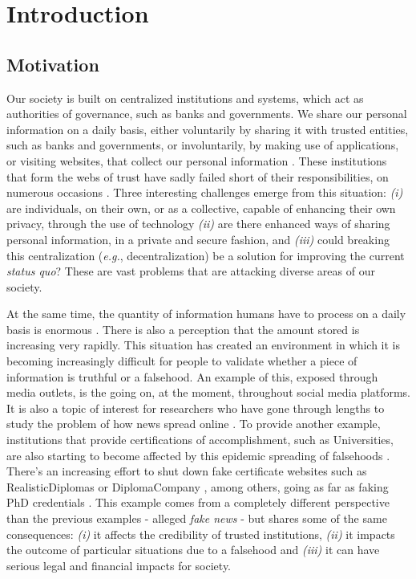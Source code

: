\chapter{Introduction}
\label{chap:intro}

\section{Motivation}
\label{sec:intro-motivation}

Our society is built on centralized institutions and systems, which act as authorities of governance, such as banks and governments. We share our personal information on a daily basis, either voluntarily by sharing it with trusted entities, such as banks and governments, or involuntarily, by making use of applications, or visiting websites, that collect our personal information \cite{debatin_facebook_2009, choi_embarrassing_2015, shilton_four_nodate}. These institutions that form the webs of trust have sadly failed short of their responsibilities, on numerous occasions \cite{gibbs_facebook_2014, ivashina_bank_2010, marthews_government_2017}. Three interesting challenges emerge from this situation: \emph{(i)} are individuals, on their own, or as a collective, capable of enhancing their own privacy, through the use of technology \emph{(ii)} are there enhanced ways of sharing personal information, in a private and secure fashion, and \emph{(iii)} could breaking this centralization (\textit{e.g.}, decentralization) be a solution for improving the current \textit{status quo}? These are vast problems that are attacking diverse areas of our society.

At the same time, the quantity of information humans have to process on a daily basis is enormous \cite{hilbert_worlds_2011, lee_information_2016}. There is also a perception that the amount stored is increasing very rapidly. This situation has created an environment in which it is becoming increasingly difficult for people to validate whether a piece of information is truthful or a falsehood. An example of this, exposed through media outlets, is the  going on, at the moment, throughout social media platforms. It is also a topic of interest for researchers who have gone through lengths to study the problem of how news spread online \cite{vosoughi_spread_2018}. To provide another example, institutions that provide certifications of accomplishment, such as Universities, are also starting to become affected by this epidemic spreading of falsehoods \cite{lam_how_2017}. There’s an increasing effort to shut down fake certificate websites \cite{camilla_telegraph} such as RealisticDiplomas \cite{RealisticDiplomas} or DiplomaCompany \cite{DiplomaCompany}, among others, going as far as faking PhD credentials \cite{doctoroff_tang_2010}. This example comes from a completely different perspective than the previous examples - alleged \textit{fake news} - but shares some of the same consequences: \emph{(i)} it affects the credibility of trusted institutions, \emph{(ii)} it impacts the outcome of particular situations due to a falsehood and \emph{(iii)} it can have serious legal and financial impacts for society.

